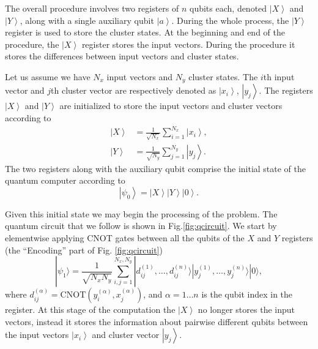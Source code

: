 \documentclass[pra,showkeys,twocolumn,showpacs,aps,10pt]{revtex4-1}
\begin{document}
The overall procedure involves two registers of $n$ qubits each, denoted $\left| X \right\rangle$ and $\left| Y \right\rangle$, along with a single auxiliary qubit $\left| a \right\rangle$.
During the whole process, the $\left| Y \right\rangle$ register is used to store the cluster states.
At the beginning and end of the procedure, the $\left| X \right\rangle$ register stores the input vectors.
During the procedure it stores the differences between input vectors and cluster states.

Let us assume we have $N_x$ input vectors and $N_y$ cluster states.
The $i$th input vector and $j$th cluster vector are respectively denoted as $\left| x_i \right\rangle$, $\left| y_j \right\rangle$.
The registers $\left| X \right\rangle$ and $\left| Y \right\rangle$ are initialized to store the input vectors and cluster vectors according to
%
\begin{align}
    \label{eq:encodnig}
    \left| X \right\rangle  & = \frac{1}{\sqrt{N_x}} \sum\limits_{i=1}^{N_x} \left| x_i \right\rangle,  \\
    \left| Y \right\rangle&  = \frac{1}{\sqrt{N_y}} \sum\limits_{j=1}^{N_y} \left| y_j \right\rangle .
\end{align}
%
The two registers along with the auxiliary qubit comprise the initial state of the quantum computer according to
%
\begin{equation}
    \label{eq:initial_state}
  \left| \psi_0 \right\rangle =
    \left| X \right\rangle
    \left| Y \right\rangle
    \left| 0 \right\rangle.
\end{equation}

Given this initial state we may begin the processing of the problem.  The quantum circuit that we follow is shown in Fig.\ref{fig:qcircuit}. We start by elementwise applying CNOT gates between all the qubits of the $X$ and $Y$ registers (the ``Encoding'' part of Fig. \ref{fig:qcircuit})
%
\begin{equation}
    | \psi_1 \rangle  =
    \frac{1}{\sqrt{N_x N_y}} \sum_{i, j=1}^{N_x,N_y}
    | d^{(1)}_{ij}, \dots, d^{(n)}_{ij} \rangle
    | y^{(1)}_j, \dots, y^{(n)}_j \rangle
    | 0 \rangle ,
\end{equation}
%
where $d^{(\alpha)}_{ij} = \mathrm{CNOT}(y^{(\alpha)}_i, x^{(\alpha)}_j)$, and $\alpha = 1 \dots n$  is the qubit index in the register.
At this stage of the computation the $\left| X \right\rangle$ no longer stores the input vectors,
instead it stores the information about pairwise different qubits between the input vectors $\left| x_i \right\rangle$ and cluster vector $\left| y_j \right\rangle$.
\end{document}
